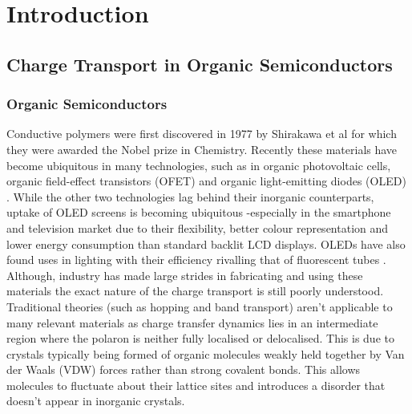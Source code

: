 \chapter{Introduction}
\label{chap:intro}

\section{Charge Transport in Organic Semiconductors}
\subsection{Organic Semiconductors}
Conductive polymers were first discovered in 1977 by Shirakawa et al  \cite{chiang_electrical_1977, Shirakawa1977Jan} for which they were awarded the Nobel prize in Chemistry. Recently these materials have become ubiquitous in many technologies, such as in organic photovoltaic cells\cite{Kippelen2009}, organic field-effect transistors (OFET) \cite{Malachowski2010Jun} and organic light-emitting diodes (OLED) \cite{ThejoKalyani2012Jun}. While the other two technologies lag behind their inorganic counterparts, uptake of OLED screens is becoming ubiquitous -especially in the smartphone and television market due to their flexibility, better colour representation and lower energy consumption than standard backlit LCD displays. OLEDs have also found uses in lighting with their efficiency rivalling that of fluorescent tubes \cite{Reineke2009May, OLED_lighting}. Although, industry has made large strides in fabricating and using these materials the exact nature of the charge transport is still poorly understood. Traditional theories (such as hopping and band transport) aren't applicable to many relevant materials \cite{coropceanu_charge_2007, Giannini2019, C0CS00198H, Fratini_2016, yavuz_dichotomy_2017} as charge transfer dynamics lies in an intermediate region where the polaron is neither fully localised or delocalised. This is due to crystals typically being formed of organic molecules weakly held together by Van der Waals (VDW) forces rather than strong covalent bonds. This allows molecules to fluctuate about their lattice sites and introduces a disorder that doesn't appear in inorganic crystals. 
\\\\
